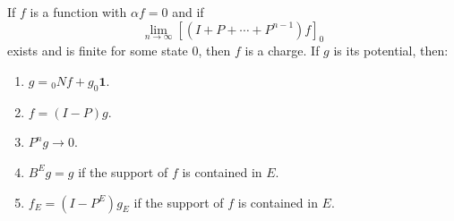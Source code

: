 If $f$ is a function with $\alpha f = 0$ and if
$$\lim_{n \to \infty} [(I + P + \cdots + P^{n-1})f]_0$$
exists and is finite for some state $0$, then $f$ is a charge. If $g$ is its potential, then:
\begin{enumerate}
\item $g = {}_0 N f + g_0 \mathbf{1}$.
\item $f = (I - P)g$.
\item $P^n g \to 0$.
\item $B^E g = g$ if the support of $f$ is contained in $E$.
\item $f_E = (I - P^E)g_E$ if the support of $f$ is contained in $E$.
\end{enumerate}
